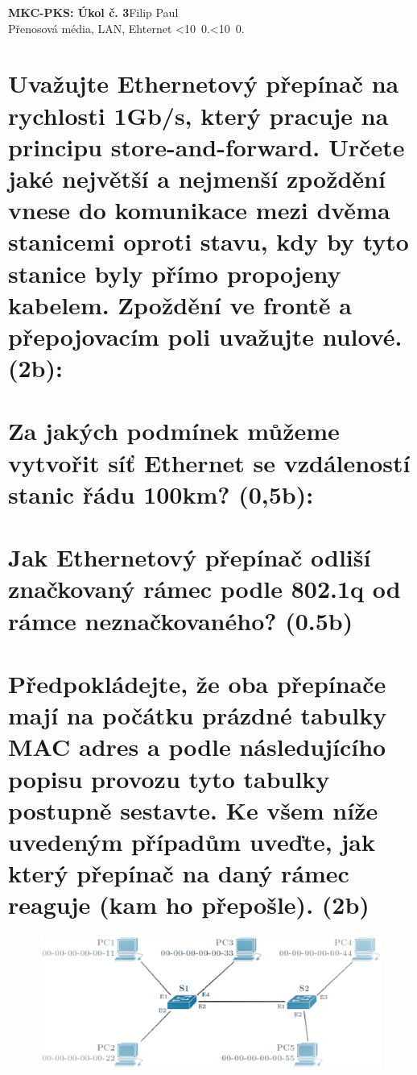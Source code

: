 \documentclass[10pt, a4paper]{article}%
\def\mydate{\leavevmode\hbox{\twodigits\day.\twodigits\month.\the\year}}
\def\twodigits#1{\ifnum#1<10 0\fi\the#1}
\begin{document}
\begin{flushleft}%
	\textbf{\Large{MKC-PKS: Úkol č. 3}}\hfill Filip Paul\\
	\large{Přenosová média, LAN, Ehternet \hfill\mydate}
\end{flushleft}
\section*{\large{\textbf{Uvažujte Ethernetový přepínač na rychlosti 1Gb/s, který pracuje na principu store-and-forward.
Určete jaké největší a nejmenší zpoždění vnese do komunikace mezi dvěma stanicemi 
oproti stavu, kdy by tyto stanice byly přímo propojeny kabelem. Zpoždění ve frontě a 
přepojovacím poli uvažujte nulové. (2b):}}}

\section*{\large{\textbf{Za jakých podmínek můžeme vytvořit síť Ethernet se vzdáleností stanic řádu 100km? (0,5b):}}}

\section*{\large{\textbf{Jak Ethernetový přepínač odliší značkovaný rámec podle 802.1q od rámce neznačkovaného? (0.5b)}}}

\section*{\large{\textbf{Předpokládejte, že oba přepínače mají na počátku prázdné tabulky MAC adres a podle 
následujícího popisu provozu tyto tabulky postupně sestavte. Ke všem níže uvedeným 
případům uveďte, jak který přepínač na daný rámec reaguje (kam ho přepošle). (2b)}}}

\begin{figure}[ht!]
	\centering
	\includegraphics[width = 1\textwidth]{zadani_sit.eps}
	
\end{figure}
	
\end{document}
